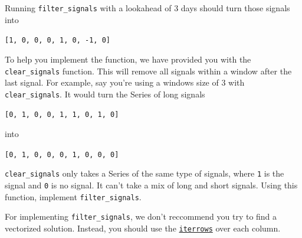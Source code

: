\documentclass[11pt]{article}
\begin{document}
Running \texttt{filter\_signals} with a lookahead of 3 days should turn
those signals into

\texttt{{[}1,\ 0,\ 0,\ 0,\ 1,\ 0,\ -1,\ 0{]}}

To help you implement the function, we have provided you with the
\texttt{clear\_signals} function. This will remove all signals within a
window after the last signal. For example, say you're using a windows
size of 3 with \texttt{clear\_signals}. It would turn the Series of long
signals

\texttt{{[}0,\ 1,\ 0,\ 0,\ 1,\ 1,\ 0,\ 1,\ 0{]}}

into

\texttt{{[}0,\ 1,\ 0,\ 0,\ 0,\ 1,\ 0,\ 0,\ 0{]}}

\texttt{clear\_signals} only takes a Series of the same type of signals,
where \texttt{1} is the signal and \texttt{0} is no signal. It can't
take a mix of long and short signals. Using this function, implement
\texttt{filter\_signals}.

For implementing \texttt{filter\_signals}, we don't reccommend you try
to find a vectorized solution. Instead, you should use the
\href{https://pandas.pydata.org/pandas-docs/version/0.21/generated/pandas.DataFrame.iterrows.html}{\texttt{iterrows}}
over each column.
\end{document}
